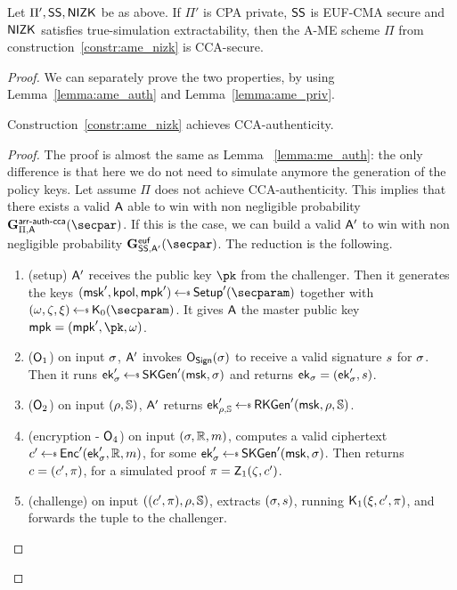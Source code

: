 \begin{theorem}\label{theo:ame_nizk}
    Let $\Pi', \mathsf{SS}, \mathsf{NIZK}$ be as above. If $\Pi'$ is CPA private, $\mathsf{SS}$ is EUF-CMA secure and $\mathsf{NIZK}$ satisfies true-simulation extractability, then the A-ME scheme $\Pi$ from construction~\ref{constr:ame_nizk} is CCA-secure.

    \begin{proof}
        We can separately prove the two properties, by using Lemma~\ref{lemma:ame_auth} and Lemma~\ref{lemma:ame_priv}.

        \begin{lemma}\label{lemma:ame_auth}
            Construction~\ref{constr:ame_nizk} achieves CCA-authenticity.
            \begin{proof}
                The proof is almost the same as Lemma ~\ref{lemma:me_auth}: the only difference is that here we do not need to simulate anymore the generation of the policy keys.
                Let assume $\Pi$ does not achieve CCA-authenticity. This implies that there exists a valid $\mathsf{A}$ able to win with non negligible probability $\NISHeufgamecca{\arranged}_{\Pi, \adversary}(\secpar)$. If this is the case, we can build a valid $\mathsf{A}'$ to win with non negligible probability $\Sigeufgame_{\sig, \adversary'}(\secpar)$. The reduction is the following.

                \begin{enumerate}
                    \item (setup) $\mathsf{A}'$ receives the public key $\pk$ from the challenger. Then it generates the keys $(\msk', \kpol, \mpk') \getsr \setup'(\secparam)$ together with $(\crs,\tpsim,\tpext)\getsr\nizkext_0(\secparam)$. It gives $\mathsf{A}$ the master public key $\mpk = (\mpk', \pk, \crs)$.
                    \item ($\mathsf{O}_1$) on input $\sigma$, $\mathsf{A}'$ invokes $\mathsf{O}_{\mathsf{Sign}}(\sigma)$ to receive a valid signature $s$ for $\sigma$. Then it runs $\ek'_\sattr \getsr \skgen'(\msk, \sattr)$ and returns $\mathsf{ek}_\sigma = (\mathsf{ek}_\sigma', s)$.
                    \item ($\mathsf{O}_2$) on input $(\rho, \mathbb{S})$, $\mathsf{A}'$ returns $\ek'_{\rattr, \saccess} \getsr \rkgen'(\msk, \rattr, \saccess)$.
                    \item (encryption - $\mathsf{O}_4$) on input $(\sigma, \mathbb{R}, m)$, computes a valid ciphertext $\cipher' \getsr \enc'(\ek'_\sattr, \raccess, \msg)$, for some $\ek'_\sattr \getsr \skgen'(\msk, \sattr)$. Then returns $c = (c', \pi)$, for a simulated proof $\pi = \mathsf{Z}_1(\zeta, c')$.
                    \item (challenge) on input $((c', \pi), \rho, \mathbb{S})$, extracts $(\sigma, s)$, running $\mathsf{K}_1(\xi, c', \pi)$, and forwards the tuple to the challenger.
                \end{enumerate}


\end{proof}
\end{lemma}
\end{proof}
\end{theorem}
